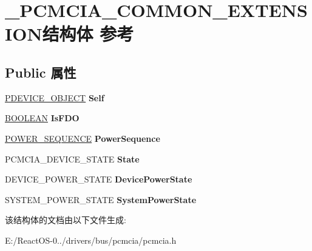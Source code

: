 \hypertarget{struct___p_c_m_c_i_a___c_o_m_m_o_n___e_x_t_e_n_s_i_o_n}{}\section{\+\_\+\+P\+C\+M\+C\+I\+A\+\_\+\+C\+O\+M\+M\+O\+N\+\_\+\+E\+X\+T\+E\+N\+S\+I\+O\+N结构体 参考}
\label{struct___p_c_m_c_i_a___c_o_m_m_o_n___e_x_t_e_n_s_i_o_n}
\subsection*{Public 属性}
\begin{DoxyCompactItemize}
\item 
\mbox{\label{struct___p_c_m_c_i_a___c_o_m_m_o_n___e_x_t_e_n_s_i_o_n_a101835f89734d92e582452cb2931c1f5}} 
\hyperlink{struct___d_e_v_i_c_e___o_b_j_e_c_t}{P\+D\+E\+V\+I\+C\+E\+\_\+\+O\+B\+J\+E\+CT} {\bfseries Self}
\item 
\mbox{\label{struct___p_c_m_c_i_a___c_o_m_m_o_n___e_x_t_e_n_s_i_o_n_a1c7b40510e02db438c8f625cc9a944ea}} 
\hyperlink{_processor_bind_8h_a112e3146cb38b6ee95e64d85842e380a}{B\+O\+O\+L\+E\+AN} {\bfseries Is\+F\+DO}
\item 
\mbox{\label{struct___p_c_m_c_i_a___c_o_m_m_o_n___e_x_t_e_n_s_i_o_n_a546138a39cb85a04816c4b516f9ac798}} 
\hyperlink{struct___p_o_w_e_r___s_e_q_u_e_n_c_e}{P\+O\+W\+E\+R\+\_\+\+S\+E\+Q\+U\+E\+N\+CE} {\bfseries Power\+Sequence}
\item 
\mbox{\label{struct___p_c_m_c_i_a___c_o_m_m_o_n___e_x_t_e_n_s_i_o_n_a4bc5451bd92043a60578890aabb8577c}} 
P\+C\+M\+C\+I\+A\+\_\+\+D\+E\+V\+I\+C\+E\+\_\+\+S\+T\+A\+TE {\bfseries State}
\item 
\mbox{\label{struct___p_c_m_c_i_a___c_o_m_m_o_n___e_x_t_e_n_s_i_o_n_a701958dbd2bb6fc9dc6721dd7c299539}} 
D\+E\+V\+I\+C\+E\+\_\+\+P\+O\+W\+E\+R\+\_\+\+S\+T\+A\+TE {\bfseries Device\+Power\+State}
\item 
\mbox{\label{struct___p_c_m_c_i_a___c_o_m_m_o_n___e_x_t_e_n_s_i_o_n_a5a856ef55c35cb84c0d6d7ac87125c5e}} 
S\+Y\+S\+T\+E\+M\+\_\+\+P\+O\+W\+E\+R\+\_\+\+S\+T\+A\+TE {\bfseries System\+Power\+State}
\end{DoxyCompactItemize}


该结构体的文档由以下文件生成\+:\begin{DoxyCompactItemize}
\item 
E\+:/\+React\+O\+S-\/0../drivers/bus/pcmcia/pcmcia.\+h\end{DoxyCompactItemize}
